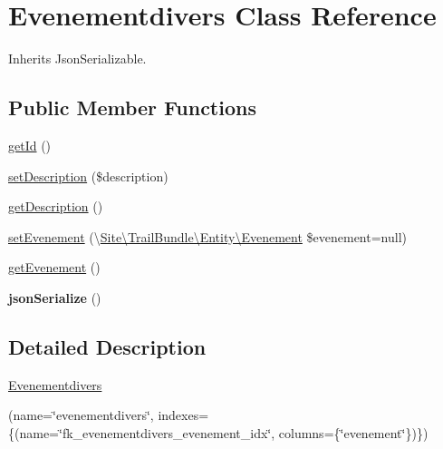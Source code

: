 \hypertarget{class_site_1_1_trail_bundle_1_1_entity_1_1_evenementdivers}{}\section{Evenementdivers Class Reference}
\label{class_site_1_1_trail_bundle_1_1_entity_1_1_evenementdivers}


Inherits Json\+Serializable.

\subsection*{Public Member Functions}
\begin{DoxyCompactItemize}
\item 
\hyperlink{class_site_1_1_trail_bundle_1_1_entity_1_1_evenementdivers_a12251d0c022e9e21c137a105ff683f13}{get\+Id} ()
\item 
\hyperlink{class_site_1_1_trail_bundle_1_1_entity_1_1_evenementdivers_a31fad3e39336ea079ea758e051866627}{set\+Description} (\$description)
\item 
\hyperlink{class_site_1_1_trail_bundle_1_1_entity_1_1_evenementdivers_a2e7bb35c71bf1824456ceb944cb7a845}{get\+Description} ()
\item 
\hyperlink{class_site_1_1_trail_bundle_1_1_entity_1_1_evenementdivers_a6ed044dcb38f66a09b105075b59bd8ed}{set\+Evenement} (\textbackslash{}\hyperlink{class_site_1_1_trail_bundle_1_1_entity_1_1_evenement}{Site\textbackslash{}\+Trail\+Bundle\textbackslash{}\+Entity\textbackslash{}\+Evenement} \$evenement=null)
\item 
\hyperlink{class_site_1_1_trail_bundle_1_1_entity_1_1_evenementdivers_a0d200fcb8e70d13b45e20baf2269ed3f}{get\+Evenement} ()
\item 
\hypertarget{class_site_1_1_trail_bundle_1_1_entity_1_1_evenementdivers_ad402d8679325bc514874370f02b5c2ac}{}{\bfseries json\+Serialize} ()\label{class_site_1_1_trail_bundle_1_1_entity_1_1_evenementdivers_ad402d8679325bc514874370f02b5c2ac}

\end{DoxyCompactItemize}


\subsection{Detailed Description}
\hyperlink{class_site_1_1_trail_bundle_1_1_entity_1_1_evenementdivers}{Evenementdivers}

(name=\char`\"{}evenementdivers\char`\"{}, indexes=\{(name=\char`\"{}fk\+\_\+evenementdivers\+\_\+evenement\+\_\+idx\char`\"{}, columns=\{\char`\"{}evenement\char`\"{}\})\})  


